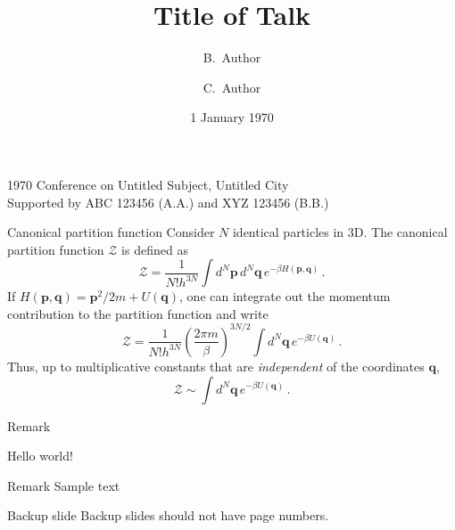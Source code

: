 \documentclass[noamssymb,noamsmath,aspectratio=169,10pt]{beamer}
\title{Title of Talk}
\author{\texorpdfstring{\altalert{\textbf{A.~Author}}}{A.~Author} \and B.~Author \and C.~Author}
\institute{Untitled Department, Untitled Institute}
\date{1 January 1970}
\begin{document}
\begin{frame}
  \titlepage
  \begin{center}
    {\small 1970 Conference on Untitled Subject, Untitled City\\[\baselineskip]}
    {\footnotesize Supported by ABC 123456 (A.A.) and XYZ 123456 (B.B.)}
  \end{center}
\end{frame}

\begin{frame}{Canonical partition function}
Consider $N$ identical particles in 3D.
The canonical partition function $\mathcal{Z}$ is defined as
\begin{equation}
  \mathcal{Z} = \frac{1}{N! h^{3N}}\int d^{N}\mathbf{p}\, d^{N}\mathbf{q}\, e^{-\beta H(\mathbf{p},\mathbf{q})}\,.
\end{equation}
%
If $H(\mathbf{p},\mathbf{q}) = \mathbf{p}^2/2m + U(\mathbf{q})$, one can integrate out the momentum contribution to the partition function and write
\begin{equation}
  \mathcal{Z} = \frac{1}{N! h^{3N}}\left(\frac{2\pi m}{\beta}\right)^{3N/2}\int d^{N}\mathbf{q}\, e^{-\beta U(\mathbf{q})}\,.
\end{equation}
%
Thus, up to multiplicative constants that are \emph{independent} of the coordinates $\mathbf{q}$,
\begin{equation}
  \mathcal{Z} \sim \int d^{N}\mathbf{q}\, e^{-\beta U(\mathbf{q})}\,.
\end{equation}
\end{frame}

\begin{frame}{Remark}

\alert{Hello world!}

\begin{block}{Remark}
Sample text
\end{block}

\end{frame}

\begin{frame}{Backup slide}
  Backup slides should not have page numbers.
\end{frame}
\end{document}
